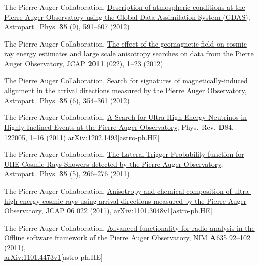 \begin{etaremune}
\item {}The Pierre Auger Collaboration, 
\href{http://dx.doi.org/10.1016/j.astropartphys.2011.12.002}{{Description
of atmospheric conditions at the Pierre Auger Observatory using the Global Data
Assimilation System (GDAS)}}, Astropart.\ Phys. {\textbf{35}} (9), 591--607 (2012)

\item {}The Pierre Auger Collaboration, 
\href{http://dx.doi.org/10.1088/1475-7516/2011/11/022}{{The effect of the
geomagnetic field on cosmic ray energy estimates and large scale anisotropy
searches on data from the Pierre Auger Observatory}}, JCAP {\textbf{2011}} (022),
1--23 (2012)

\item {}The Pierre Auger Collaboration, 
\href{http://dx.doi.org/10.1016/j.astropartphys.2011.10.004}{{Search for
signatures of magnetically-induced alignment in the arrival directions measured
by the Pierre Auger Observatory}}, Astropart.\ Phys. {\textbf{35}} (6), 354--361
(2012)

\item {}The Pierre Auger Collaboration,
\href{http://dx.doi.org/10.1016/10.1103/PhysRevD.84.122005}{{A Search for
Ultra-High Energy Neutrinos in Highly Inclined Events at the Pierre Auger
Observatory}}, Phys.\  Rev. {\textbf D84}, 122005, 1--16 (2011)
\href{http://arxiv.org/abs/1202.1493}{arXiv:1202.1493}[astro-ph.HE]

\item {}The Pierre Auger Collaboration, 
\href{http://dx.doi.org/10.1016/j.astropartphys.2011.08.001}{{The Lateral
Trigger Probability function for UHE Cosmic Rays Showers detected by the Pierre
Auger Observatory}}, Astropart.\ Phys. {\textbf{35}} (5), 266--276 (2011)

\item {}The Pierre Auger Collaboration,
\href{http://dx.doi.org/10.1088/1475-7516/2011/06/022}{{Anisotropy and
chemical composition of ultra-high energy cosmic rays using arrival directions
measured by the Pierre Auger Observatory}}, JCAP {\textbf 06} 022 (2011),
\href{http://arxiv.org/abs/1106.3048}{arXiv:1101.3048v1}[astro-ph.HE]

\item {}The Pierre Auger Collaboration,
\href{http://dx.doi.org/10.1016/j.nima.2011.01.049}{{{Advanced
functionality for radio analysis in the Offline software framework of the
Pierre Auger Observatory}}}, NIM {\textbf A635} 92--102
(2011),\\
\href{http://arxiv.org/abs/1101.4473}{arXiv:1101.4473v1}[astro-ph.HE]


\end{etaremune}
